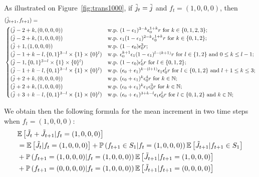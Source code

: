\documentclass[11pt]{article}
\theoremstyle{plain}
\theoremstyle{definition}
\theoremstyle{remark}
\newcommand{\NN}{\mathbb{N}}
\newcommand{\prob}[1]{\mathbb{P}\left( #1 \right)}
\newcommand{\esp}[1]{\mathbb{E}\left[ #1 \right]}
\begin{document}
As illustrated on Figure~\ref{fig:trans1000}, if $\Tilde{j}_t = \Tilde{j}$ and $f_t = (1,0,0,0)$, then
\begin{align}
    & (\Tilde{j}_{t+1},f_{t+1}) = \nonumber \\ 
    & \begin{cases}
    (\Tilde{j}-2+k,(0,0,0,0)) & \text{w.p.\ }(1-\epsilon_1)^{3-k} \epsilon_0^{1+k} r \text{ for } k\in\{0,1,2,3\};\\
    (\Tilde{j}-2+k,(1,0,0,0)) & \text{w.p.\ } \epsilon_1(1-\epsilon_1)^{2-k} \epsilon_0^{1+k} r \text{ for } k\in\{0,1,2\};\\
    (\Tilde{j}+1,(1,0,0,0)) & \text{w.p.\ } (1-\epsilon_0)\epsilon_0^3r;\\
    (\Tilde{j}-1+k-l,\{0,1\}^{3-l}\times\{1\}\times\{0\}^{l}) & \text{w.p.\ } \epsilon_0^{k+1}\epsilon_1(1-\epsilon_1)^{l-(k+1)}r \text{ for } l \in \{1,2\} \text{ and } 0\leq k\leq l-1;\\
    (\Tilde{j}-1,\{0,1\}^{3-l}\times\{1\}\times\{0\}^{l}) & \text{w.p.\ } (1-\epsilon_0) \epsilon_0^{l}r \text{ for } l \in \{0,1,2\};\\
    (\Tilde{j}-1+k-l,\{0,1\}^{3-l}\times\{1\}\times\{0\}^{l}) & \text{w.p.\ } (\epsilon_0+\epsilon_1)^{k-(l+1)} \epsilon_1 \epsilon_0^l r \text{ for } l \in \{0,1,2\} \text{ and } l+1\leq k \leq 3;\\        
    (\Tilde{j}+2+k,(0,0,0,0)) & \text{w.p.\ } (\epsilon_0+\epsilon_1)^k \epsilon_0^4 r  \text{ for } k\in\NN;\\
    (\Tilde{j}+2+k,(1,0,0,0)) & \text{w.p.\ } (\epsilon_0+\epsilon_1)^k \epsilon_1 \epsilon_0^3 r  \text{ for } k\in\NN;\\
    (\Tilde{j}+3+k-l,\{0,1\}^{3-l}\times\{1\}\times\{0\}^{l}) & \text{w.p.\ } (\epsilon_0+\epsilon_1)^{3+k-l}\epsilon_1 \epsilon_0^l r  \text{ for } l \in \{0,1,2\} \text{ and } k\in\NN;
    \end{cases} \label{eq:trans1000}
\end{align}

We obtain then the following formula for the mean increment in two time steps when $f_t = (1,0,0,0)$:
\begin{align}
    & \esp{\Tilde{J}_{t}+\Tilde{J}_{t+1}|f_t=(1,0,0,0)} \nonumber \\
    & = \esp{\Tilde{J}_{t}|f_t=(1,0,0,0)} + \prob{f_{t+1} \in S_1 |f_t=(1,0,0,0)} \esp{\Tilde{J}_{t+1}|f_{t+1}\in S_1} \nonumber \\
    & + \prob{f_{t+1}=(1,0,0,0) |f_t=(1,0,0,0)} \esp{\Tilde{J}_{t+1}|f_{t+1}=(1,0,0,0)} \nonumber \\
    & + \prob{f_{t+1}=(0,0,0,0) |f_t=(1,0,0,0)} \esp{\Tilde{J}_{t+1}|f_{t+1}=(0,0,0,0)} \label{eq:driftAux1000}
\end{align}
\end{document}
